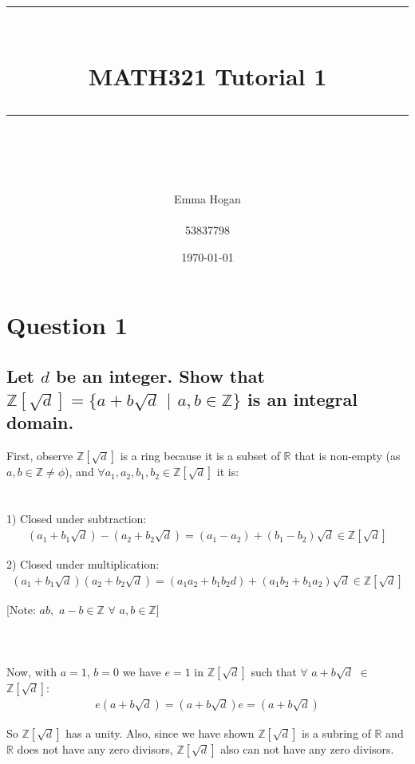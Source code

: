 \documentclass{article}
\title{	
	\normalfont\normalsize
	\vspace{25pt} %
	\rule{\linewidth}{0.5pt}\\ %
	\vspace{20pt} %
	{\huge MATH321 Tutorial 1}\\ %
	\vspace{12pt} %
	\rule{\linewidth}{2pt}\\ %
	\vspace{12pt} %
}
\author{\LARGE Emma Hogan \\\\53837798} %
\date{\normalsize\today} %
\begin{document}
\begin{titlepage}
\maketitle
\thispagestyle{empty}
\end{titlepage}
\section*{Question 1}
\subsection*{Let \(d\) be an integer. Show that \(\mathds{Z}[\sqrt{d}] = \{a + b\sqrt{d}\) \(|\) \(a,b \in \mathds{Z}\}\) is an integral domain.}

\solution
First, observe \(\mathds{Z}[\sqrt{d}]\) is a ring because it is a subset of \(\mathds{R}\) that is non-empty (as \(a, b \in \mathds{Z} \neq \phi\)), and \(\forall a_1, a_2, b_1, b_2 \in \mathds{Z}[\sqrt{d}]\) it is:
\\\\\\
	\hspace*{8mm} 1) Closed under subtraction:
\begin{align*}
  (a_1 + b_1\sqrt{d}) - (a_2 + b_2\sqrt{d}) = (a_1 - a_2) + (b_1 - b_2)\sqrt{d} \in \mathds{Z}[\sqrt{d}]
\end{align*}	

	\hspace*{8mm} 2) Closed under multiplication:
\begin{align*}
	(a_1 + b_1\sqrt{d})(a_2 + b_2\sqrt{d}) = (a_1 a_2 + b_1 b_2 d) + (a_1 b_2 + b_1 a_2)\sqrt{d} \in \mathds{Z}[\sqrt{d}]
\end{align*}


[Note: \(ab,\) \(a-b \in \mathds{Z}\) \(\forall\) \(a, b \in \mathds{Z}\)]
\\\\\\\\
Now, with \(a=1\), \(b=0\) we have \(e = 1\) in \(\mathds{Z}[\sqrt{d}]\) such that \(\forall\) \(a+b\sqrt{d}\) \(\in\) \(\mathds{Z}[\sqrt{d}]\):
\begin{align*}
	e(a+b\sqrt{d}) = (a+b\sqrt{d})e = (a+b\sqrt{d})
\end{align*}

So \(\mathds{Z}[\sqrt{d}]\) has a unity. Also, since we have shown \(\mathds{Z}[\sqrt{d}]\) is a subring of \(\mathds{R}\) and \(\mathds{R}\) does not have any zero divisors, \(\mathds{Z}[\sqrt{d}]\) also can not have any zero divisors.
\end{document}
